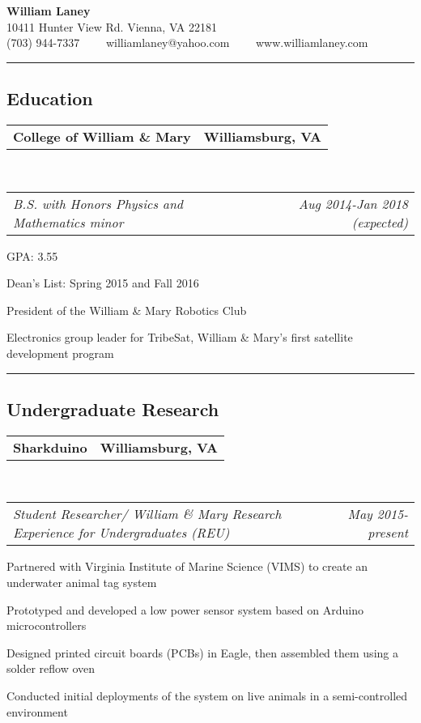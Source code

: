 \documentclass[10pt,letterpaper]{article}
\makeatletter
\newcommand{\headerrow}[2]
{\begin{tabular*}{\linewidth}{l@{\extracolsep{\fill}}r}
	#1 &
	#2 \\
\end{tabular*}}
\makeatother
\begin{document}
\begin{center}
{\LARGE \textbf{William Laney}}\\
\vspace{0.1em}
10411 Hunter View Rd.
Vienna, VA 22181
\\
(703) 944-7337\ \ \textbullet
\ \ williamlaney@yahoo.com\ \ \textbullet
\ \ www.williamlaney.com
\end{center}

\hrule
\vspace{-0.4em}
\subsection*{Education}

	\headerrow
		{\textbf{College of William \& Mary}}
		{\textbf{Williamsburg, VA}}
	\\
	\headerrow
		{\emph{B.S. with Honors Physics and Mathematics minor}}
		{\emph{Aug 2014-Jan 2018 (expected)}}
	\begin{itemize*}
		\item GPA: 3.55
		\item Dean's List: Spring 2015 and Fall 2016
		\item President of the William \& Mary Robotics Club
		\item Electronics group leader for TribeSat, William \& Mary's first satellite development program
	\end{itemize*}

\hrule
\vspace{-0.4em}
\subsection*{Undergraduate Research}

	\headerrow
		{\textbf{Sharkduino}}
		{\textbf{Williamsburg, VA}}
	\\
	\headerrow
		{\emph{Student Researcher/ William \& Mary Research Experience for Undergraduates (REU)}}
		{\emph{May 2015-present}}
	\begin{itemize*}
	\item Partnered with Virginia Institute of Marine Science (VIMS) to create an underwater animal tag system
	\item Prototyped and developed a low power sensor system based on Arduino microcontrollers
	\item Designed printed circuit boards (PCBs) in Eagle, then assembled them using a solder reflow oven
	\item Conducted initial deployments of the system on live animals in a semi-controlled environment
	
	\end{itemize*}
	
\end{document}
